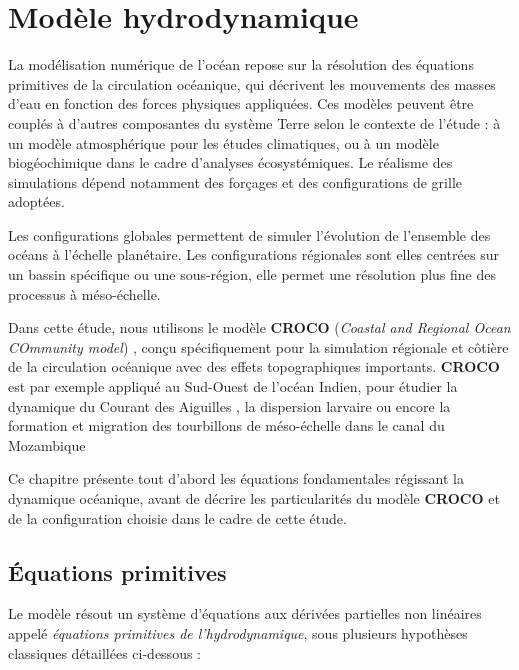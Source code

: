 \chapter{Modèle hydrodynamique}

La modélisation numérique de l’océan repose sur la résolution des équations primitives de la circulation océanique, qui décrivent les mouvements des masses d’eau en fonction des forces physiques appliquées. Ces modèles peuvent être couplés à d'autres composantes du système Terre selon le contexte de l'étude : à un modèle atmosphérique pour les études climatiques, ou à un modèle biogéochimique dans le cadre d'analyses écosystémiques. Le réalisme des simulations dépend notamment des forçages et des configurations de grille adoptées.

Les configurations globales permettent de simuler l’évolution de l’ensemble des océans à l’échelle planétaire. Les configurations régionales sont elles centrées sur un bassin spécifique ou une sous-région, elle permet une résolution plus fine des processus à méso-échelle.

Dans cette étude, nous utilisons le modèle \textbf{CROCO} (\textit{Coastal and Regional Ocean COmmunity model}) \cite{jullien_crocos_2024}, conçu spécifiquement pour la simulation régionale et côtière de la circulation océanique avec des effets topographiques importants. \textbf{CROCO} est par exemple appliqué au Sud-Ouest de l'océan Indien, pour étudier la dynamique du Courant des Aiguilles \cite{renault_modulation_2017}, la dispersion larvaire \cite{vogt-vincent_multidecadal_2023} ou encore la formation et migration des tourbillons de méso-échelle dans le canal du Mozambique \cite{halo_eddy_2014, halo_mesoscale_2014}

Ce chapitre présente tout d’abord les équations fondamentales régissant la dynamique océanique, avant de décrire les particularités du modèle \textbf{CROCO} et de la configuration choisie dans le cadre de cette étude.

\section{Équations primitives}

Le modèle résout un système d'équations aux dérivées partielles non linéaires appelé \textit{équations primitives de l'hydrodynamique}, sous plusieurs hypothèses classiques détaillées ci-dessous :

